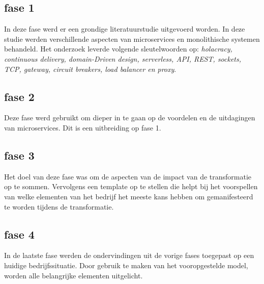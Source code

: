 \subsection{fase 1}

In deze fase werd er een grondige literatuurstudie uitgevoerd worden. In deze studie werden verschillende aspecten van microservices en monolithische systemen behandeld. Het onderzoek leverde volgende sleutelwoorden op: \emph{holacracy, continuous delivery, domain-Driven design, serverless, API, REST, sockets, TCP, gateway, circuit breakers, load balancer en proxy}.

\subsection{fase 2}
Deze fase werd gebruikt om dieper in te gaan op de voordelen en de uitdagingen van microservices. Dit is een uitbreiding op fase 1.

\subsection{fase 3}
Het doel van deze fase was om de aspecten van de impact van de transformatie op te sommen. Vervolgens een template op te stellen die helpt bij het voorspellen van welke elementen van het bedrijf het meeste kans hebben om gemanifesteerd te worden tijdens de transformatie.

\subsection{fase 4}

In de laatste fase werden de ondervindingen uit de vorige fases toegepast op een huidige bedrijfssituatie. Door gebruik te maken van het vooropgestelde model, worden alle belangrijke elementen uitgelicht.






